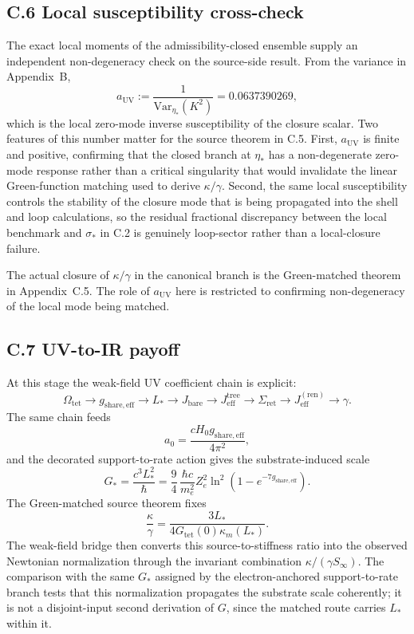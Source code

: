 \documentclass[11pt]{article}
\begin{document}
\subsection*{C.6 Local susceptibility cross-check}

The exact local moments of the admissibility-closed ensemble supply an independent non-degeneracy check on the source-side result. From the variance in Appendix~B,
\[
a_{\mathrm{UV}}
:=
\frac{1}{\mathrm{Var}_{\eta_*}(K^2)}
=
0.0637390269,
\]
which is the local zero-mode inverse susceptibility of the closure scalar. Two features of this number matter for the source theorem in C.5. First, $a_{\mathrm{UV}}$ is finite and positive, confirming that the closed branch at $\eta_*$ has a non-degenerate zero-mode response rather than a critical singularity that would invalidate the linear Green-function matching used to derive $\kappa/\gamma$. Second, the same local susceptibility controls the stability of the closure mode that is being propagated into the shell and loop calculations, so the residual fractional discrepancy between the local benchmark and $\sigma_*$ in C.2 is genuinely loop-sector rather than a local-closure failure.

The actual closure of $\kappa/\gamma$ in the canonical branch is the Green-matched theorem in Appendix~C.5. The role of $a_{\mathrm{UV}}$ here is restricted to confirming non-degeneracy of the local mode being matched.

\subsection*{C.7 UV-to-IR payoff}

At this stage the weak-field UV coefficient chain is explicit:
\[
\Omega_{\mathrm{tet}}
\rightarrow
g_{\mathrm{share,eff}}
\rightarrow
L_*
\rightarrow
J_{\mathrm{bare}}
\rightarrow
J_{\mathrm{eff}}^{\mathrm{tree}}
\rightarrow
\Sigma_{\mathrm{ret}}
\rightarrow
J_{\mathrm{eff}}^{(\mathrm{ren})}
\rightarrow
\gamma.
\]
The same chain feeds
\[
a_0=\frac{cH_0g_{\mathrm{share,eff}}}{4\pi^2},
\]
and the decorated support-to-rate action gives the substrate-induced scale
\[
G_*=\frac{c^3L_*^2}{\hbar}
=
\frac94\,\frac{\hbar c}{m_e^2}
Z_e^2\ln^2\!\left(1-e^{-7g_{\mathrm{share,eff}}}\right).
\]
The Green-matched source theorem fixes
\[
\frac{\kappa}{\gamma}
=
\frac{3L_*}{4G_{\mathrm{tet}}(0)\kappa_m(L_*)}.
\]
The weak-field bridge then converts this source-to-stiffness ratio into the observed Newtonian normalization through the invariant combination $\kappa/(\gamma S_\infty)$. The comparison with the same $G_*$ assigned by the electron-anchored support-to-rate branch tests that this normalization propagates the substrate scale coherently; it is not a disjoint-input second derivation of $G$, since the matched route carries $L_*$ within it.
\end{document}
